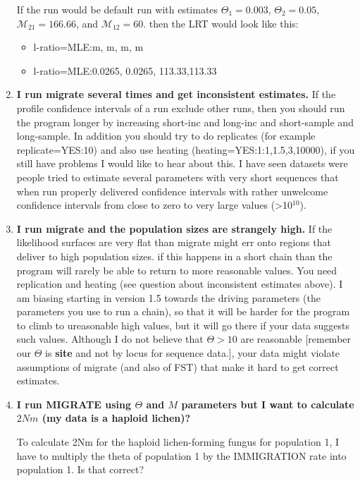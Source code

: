 \begin{enumerate}
If the run would be default run with estimates $\Theta_1=0.003$, $\Theta_2=0.05$, $\mathcal{M}_{21}=166.66$, and  $\mathcal{M}_{12}=60$. then the  LRT would look like this:
\begin{itemize}
\item l-ratio=MLE:m, m, m, m 
\item l-ratio=MLE:0.0265, 0.0265, 113.33,113.33
\end{itemize}



\item {\bfseries I run migrate several times and get inconsistent estimates.}
If the profile confidence intervals of a run exclude other runs, then you should run
the program longer by increasing short-inc and long-inc and short-sample and long-sample.
In addition you should try to do replicates (for example replicate=YES:10) and also use
heating (heating=YES:1:{1,1.5,3,10000}), if you still have problems I would like to hear about this.
I have seen datasets were people tried to estimate several parameters with very short sequences that
when run properly delivered confidence intervals with rather unwelcome confidence intervals from
close to zero to very large values (>10$^{10}$).
\item {\bfseries I run migrate and the population sizes are strangely high.}
If the likelihood surfaces are very flat than migrate might err onto regions that deliver to high population sizes.
if this happens in a short chain than the program will rarely be able to return to more reasonable values.
You need replication and heating (see question about inconsistent estimates above). I am biasing starting in version 1.5
towards the driving parameters (the parameters you use to run a chain), so that it will be harder for the program to
climb to ureasonable high values, but it will go there if your data suggests such values. Although I do not believe that
$\Theta > 10$ are reasonable [remember our $\Theta$ is {\bfseries site} and not by locus for sequence data.], your data might
violate assumptions of migrate (and also of FST) that make it hard to get correct estimates. 

\item{\bfseries  I run MIGRATE using $\Theta$ and $M$ parameters but I want to calculate $2Nm$ (my data is a haploid lichen)?}

To calculate 2Nm for the haploid lichen-forming fungus for population 1, I have to multiply the theta of population 1 by the IMMIGRATION rate into population 1. Is that correct?


\end{enumerate}
